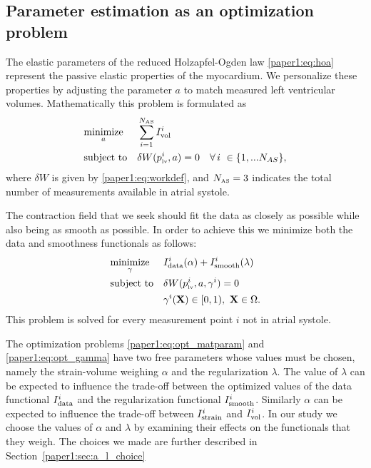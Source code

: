 \subsection{Parameter estimation as an optimization problem}
\label{paper1:sec:param_est}
The elastic parameters of the reduced
Holzapfel-Ogden law \eqref{paper1:eq:hoa} represent the passive elastic
properties of the myocardium. We personalize these properties by
adjusting the parameter $a$ to match measured left ventricular volumes.
Mathematically this problem is formulated as
\begin{equation}
\begin{aligned}
\label{paper1:eq:opt_matparam}
& \underset{a}{\text{minimize}}
& &  \sum_{i = 1}^{N_\textnormal{\tiny \text{AS}}} I_{\text{vol}}^i \\
& \text{subject to}
& & \delta W(p_{\textnormal{\tiny{lv}}}^i, a) = 0 \quad \forall \,  i \ \in \{1,...N_{AS} \},
\end{aligned}
\end{equation}
where $\delta W$ is given by \eqref{paper1:eq:workdef}, and $N_\textnormal{\tiny \text{AS}} =
3$ indicates the total number of measurements available in atrial
systole.

The contraction field that we seek should fit the data as closely as possible while 
also being as smooth as possible. In order to achieve this we minimize both the 
data and smoothness functionals as follows:
\begin{equation}
\begin{aligned}
\label{paper1:eq:opt_gamma}
& \underset{\gamma}{\text{minimize}}
& & I_{\text{data}}^i(\alpha) + I_{\text{smooth}}^i(\lambda) \\
& \text{subject to}
& &  \delta W(p_{\textnormal{\tiny{lv}}}^i, a, \gamma^i) = 0 \quad \\
&&& \gamma^i(\mathbf{X}) \in [0, 1), \ \mathbf{X} \in \Omega.
\end{aligned}
\end{equation}
This problem is solved for every measurement point $i$ not in atrial systole.

The optimization problems \eqref{paper1:eq:opt_matparam} and \eqref{paper1:eq:opt_gamma} have two
free parameters whose values must be chosen, namely the strain-volume
weighing $\alpha$ and the regularization $\lambda$. The value of $\lambda$ can be expected to influence the trade-off
between the optimized values of the data functional $I_{\text{data}}^i$ and the regularization functional
$I_{\text{smooth}}^i$. Similarly $\alpha$ can be expected to influence the trade-off between $I_{\text{strain}}^i$
and $I_{\text{vol}}^i$. In our study we choose the values of $\alpha$ and $\lambda$ by examining their effects on the functionals
that they weigh. The choices we made are further described in Section~\ref{paper1:sec:a_l_choice}

